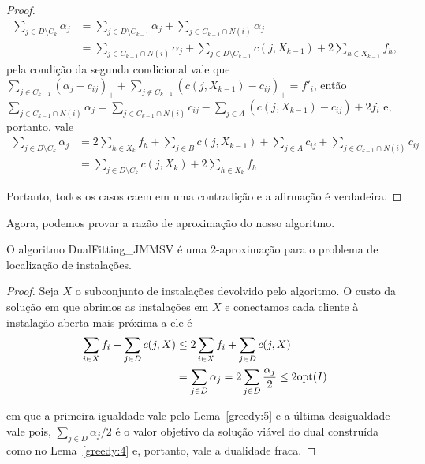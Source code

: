 \begin{proof}
\begin{subequations}
\begin{align*}
\sum_{j \in D \setminus C_k} \alpha_j &= \sum_{j \in D\setminus C_{k-1}} \alpha_j + \sum_{j \in C_{k-1}\cap N(i)} \alpha_j \\
&= \sum_{j \in C_{k-1}\cap N(i)} \alpha_j +  \sum_{j \in D\setminus C_{k-1}}c(j,X_{k-1}) + 2 \sum_{h \in X_{k-1}} f_h,
\end{align*}
\end{subequations}
pela condição da segunda condicional vale que $\sum_{j \in C_{k-1}} (\alpha_j - c_{ij})_+ + \sum_{j \not \in C_{k-1}}(c(j,X_{k-1}) - c_{ij})_+ = f'_i$, então $\sum_{j \in C_{k-1}\cap N(i)} \alpha_j = \sum_{j \in C_{k-1}\cap N(i)} c_{ij} - \sum_{j \in A} (c(j,X_{k-1}) - c_{ij}) + 2f_i$ e, portanto, vale
\begin{subequations}
\begin{align*}
\sum_{j \in D \setminus C_k} \alpha_j &= 2\sum_{h \in X_k} f_h + \sum_{j \in B} c(j,X_{k-1}) + \sum_{j \in A} c_{ij} + \sum_{j \in C_{k-1} \cap N(i)} c_{ij}\\
&= \sum_{j \in D \setminus C_k} c(j,X_k)  + 2 \sum_{h \in X_k} f_h  
\end{align*}
\end{subequations}

Portanto, todos os casos caem em uma contradição e a afirmação é verdadeira.
\end{proof}


Agora, podemos provar a razão de aproximação do nosso algoritmo.

\begin{theorem}
O algoritmo {\sc DualFitting\_JMMSV} é uma 2-aproximação para o problema de localização de instalações.
\end{theorem} 
\begin{proof}
Seja $X$ o subconjunto de instalações devolvido pelo algoritmo.  O custo da solução em que abrimos as instalações em $X$ e conectamos cada cliente à instalação aberta mais próxima a ele é
\begin{subequations}
\begin{align*}
\sum_{i \in X} f_i + \sum_{j \in D}c(j,X) &\leq 2\sum_{i \in X} f_i + \sum_{j \in D}c(j,X) \\
&= \sum_{j \in D} \alpha_j = 2\sum_{j \in D} \frac{\alpha_j}{2} \leq 2 \mathrm{opt}(I)  
\end{align*}
\end{subequations}

em que a primeira igualdade vale pelo Lema~\ref{greedy:5} e a última desigualdade vale pois, $\sum_{j \in D} \alpha_j/2 $ é o valor objetivo da solução viável do dual construída como no Lema~\ref{greedy:4} e, portanto, vale a dualidade fraca.
\end{proof}


